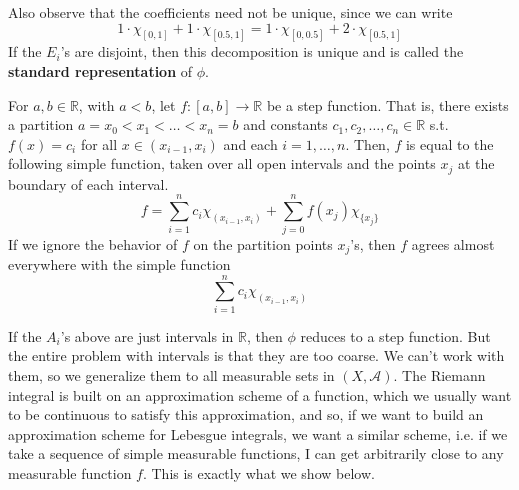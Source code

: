 \documentclass{article}
\begin{document}
Also observe that the coefficients need not be unique, since we can write 
\[1 \cdot \chi_{[0, 1]} + 1 \cdot \chi_{[0.5, 1]} = 1 \cdot \chi_{[0, 0.5]} + 2 \cdot \chi_{[0.5, 1]}\]
If the $E_i$'s are disjoint, then this decomposition is unique and is called the \textbf{standard representation} of $\phi$. 

\begin{example}
  For $a, b \in \mathbb{R}$, with $a < b$, let $f: [a, b] \longrightarrow \mathbb{R}$ be a step function. That is, there exists a partition $a = x_0 < x_1 < \ldots < x_n = b$ and constants $c_1, c_2, \ldots, c_n \in \mathbb{R}$ s.t. $f(x) = c_i$ for all $x \in (x_{i-1}, x_i)$ and each $i = 1, \ldots, n$. Then, $f$ is equal to the following simple function, taken over all open intervals and the points $x_j$ at the boundary of each interval. 
  \[f = \sum_{i=1}^n c_i \chi_{(x_{i-1}, x_i)} + \sum_{j=0}^n f(x_j) \chi_{\{x_j\}}\]
  If we ignore the behavior of $f$ on the partition points $x_j$'s, then $f$ agrees almost everywhere with the simple function 
  \[\sum_{i=1}^n c_i \chi_{(x_{i-1}, x_i)}\]
\end{example}

If the $A_i$'s above are just intervals in $\mathbb{R}$, then $\phi$ reduces to a step function. But the entire problem with intervals is that they are too coarse. We can't work with them, so we generalize them to all measurable sets in $(X, \mathcal{A})$. The Riemann integral is built on an approximation scheme of a function, which we usually want to be continuous to satisfy this approximation, and so, if we want to build an approximation scheme for Lebesgue integrals, we want a similar scheme, i.e. if we take a sequence of simple measurable functions, I can get arbitrarily close to any measurable function $f$. This is exactly what we show below. 
\end{document}
